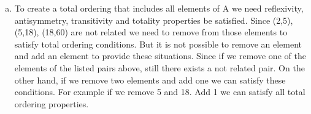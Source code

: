 \documentclass[12pt]{article}
\begin{document}
\begin{enumerate} [a)]
    $$\{(10,2), (10,5), (18,2), (60,2), (60,5), (60,10)\}$$
    \item
    To create a total ordering that includes all elements of A we need reflexivity, antisymmetry, transitivity and totality properties be satisfied. Since (2,5), (5,18), (18,60) are not related we need to remove from those elements to satisfy total ordering conditions. But it is not possible to remove an element and add an element to provide these situations. Since if we remove one of the elements of the listed pairs above, still there exists a not related pair. On the other hand, if we remove two elements and add one we can satisfy these conditions. For example if we remove 5 and 18. Add 1 we can satisfy all total ordering properties.
\end{enumerate}
\end{document}

